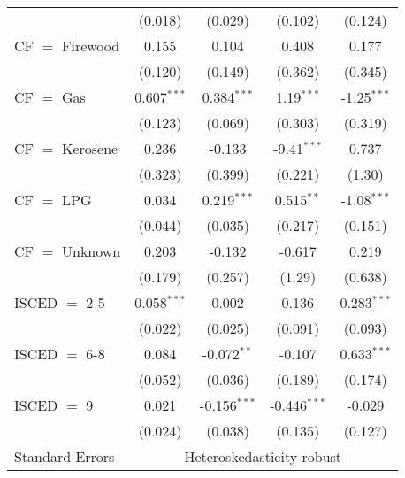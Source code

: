 \begin{table}[htbp!]
\begin{adjustbox}{width = 1\textwidth, max height = 0.95\textheight, center}
\begin{threeparttable}[b]
\begin{tabular}{lcccc}
                                 & (0.018)            & (0.029)            & (0.102)        & (0.124)\\   
            CF $=$ Firewood      & 0.155              & 0.104              & 0.408          & 0.177\\   
                                 & (0.120)            & (0.149)            & (0.362)        & (0.345)\\   
            CF $=$ Gas           & 0.607$^{***}$      & 0.384$^{***}$      & 1.19$^{***}$   & -1.25$^{***}$\\   
                                 & (0.123)            & (0.069)            & (0.303)        & (0.319)\\   
            CF $=$ Kerosene      & 0.236              & -0.133             & -9.41$^{***}$  & 0.737\\   
                                 & (0.323)            & (0.399)            & (0.221)        & (1.30)\\   
            CF $=$ LPG           & 0.034              & 0.219$^{***}$      & 0.515$^{**}$   & -1.08$^{***}$\\   
                                 & (0.044)            & (0.035)            & (0.217)        & (0.151)\\   
            CF $=$ Unknown       & 0.203              & -0.132             & -0.617         & 0.219\\   
                                 & (0.179)            & (0.257)            & (1.29)         & (0.638)\\   
            ISCED $=$ 2-5        & 0.058$^{***}$      & 0.002              & 0.136          & 0.283$^{***}$\\   
                                 & (0.022)            & (0.025)            & (0.091)        & (0.093)\\   
            ISCED $=$ 6-8        & 0.084              & -0.072$^{**}$      & -0.107         & 0.633$^{***}$\\   
                                 & (0.052)            & (0.036)            & (0.189)        & (0.174)\\   
            ISCED $=$ 9          & 0.021              & -0.156$^{***}$     & -0.446$^{***}$ & -0.029\\   
                                 & (0.024)            & (0.038)            & (0.135)        & (0.127)\\   
            \midrule 
            Standard-Errors & \multicolumn{4}{c}{Heteroskedasticity-robust} \\ 

\end{tabular}
\end{threeparttable}
\end{adjustbox}
\end{table}
